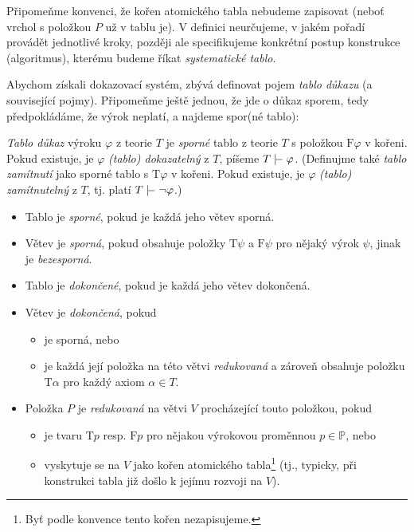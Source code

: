 Připomeňme konvenci, že kořen atomického tabla nebudeme zapisovat (neboť vrchol s položkou $P$ už v tablu je). V definici neurčujeme, v jakém pořadí provádět jednotlivé kroky, později ale specifikujeme konkrétní postup konstrukce (algoritmus), kterému budeme říkat \emph{systematické tablo}.

Abychom získali dokazovací systém, zbývá definovat pojem \emph{tablo důkazu} (a související pojmy). Připomeňme ještě jednou, že jde o důkaz sporem, tedy předpokládáme, že výrok neplatí, a najdeme spor(né tablo):

\begin{definition}
\emph{Tablo důkaz} výroku $\varphi$ z teorie $T$ je \emph{sporné} tablo z teorie $T$ s položkou $\mathrm{F}\varphi$ v kořeni. Pokud existuje, je $\varphi$ \emph{(tablo) dokazatelný} z $T$, píšeme $T\proves\varphi$. (Definujme také \emph{tablo zamítnutí} jako sporné tablo s $\mathrm{T}\varphi$ v kořeni. Pokud existuje, je $\varphi$ \emph{(tablo) zamítnutelný} z $T$, tj. platí $T\proves\neg\varphi$.)
\begin{itemize}
    \item Tablo je \emph{sporné}, pokud je každá jeho větev sporná.
    \item Větev je \emph{sporná}, pokud obsahuje položky $\mathrm{T}\psi$ a $\mathrm{F}\psi$ pro nějaký výrok $\psi$, jinak je \emph{bezesporná}.
    \item Tablo je \emph{dokončené}, pokud je každá jeho větev dokončená.
    \item Větev je \emph{dokončená}, pokud
    \begin{itemize}
        \item je sporná, nebo
        \item je každá její položka na této větvi \emph{redukovaná} a zároveň obsahuje položku $\mathrm{T}\alpha$ pro každý axiom $\alpha\in T$.
    \end{itemize}

    \item Položka $P$ je \emph{redukovaná} na větvi $V$ procházející touto položkou, pokud
    \begin{itemize}
        \item je tvaru $\mathrm{T}p$ resp. $\mathrm{F}p$ pro nějakou výrokovou proměnnou $p\in\mathbb P$, nebo
        \item vyskytuje se na $V$ jako kořen atomického tabla\footnote{Byť podle konvence tento kořen nezapisujeme.} (tj., typicky, při konstrukci tabla již došlo k jejímu rozvoji na $V$).
    \end{itemize}
\end{itemize}
\end{definition}

